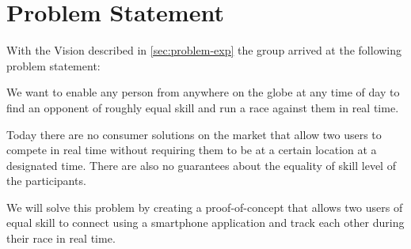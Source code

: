\section{Problem Statement}
\label{sec:problem-statement}
With the Vision described in \autoref{sec:problem-exp} the group arrived at the following problem statement: 

We want to enable any person from anywhere on the globe at any time of day to find an opponent of roughly equal skill and run a race against them in real time. 

Today there are no consumer solutions on the market that allow two users to compete in real time without requiring them to be at a certain location at a designated time. There are also no guarantees about the equality of skill level of the participants.

We will solve this problem by creating a proof-of-concept that allows two users of equal skill to connect using a smartphone application and track each other during their race in real time.